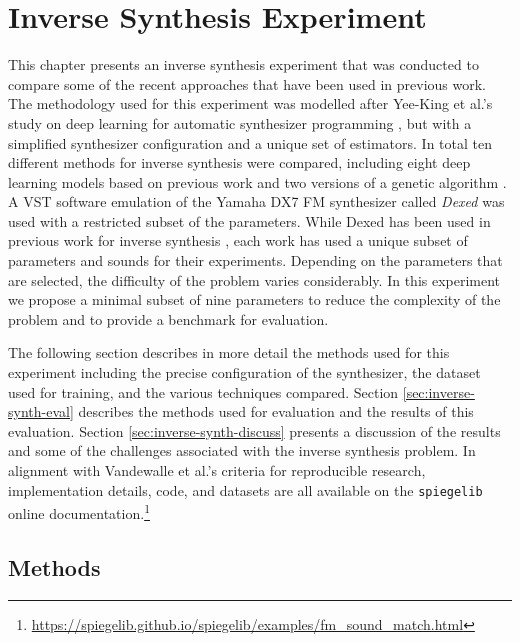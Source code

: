 \chapter{Inverse Synthesis Experiment}
\label{chapter:inverse_synth_experiment}

This chapter presents an inverse synthesis experiment that was conducted to compare some of the recent approaches that have been used in previous work. The methodology used for this experiment was modelled after Yee-King et al.'s study on deep learning for automatic synthesizer programming \cite{yee2018automatic}, but with a simplified synthesizer configuration and a unique set of estimators. In total ten different methods for inverse synthesis were compared, including eight deep learning models based on previous work \cite{barkan2019inversynth, yee2018automatic} and two versions of a genetic algorithm \cite{horner1993machine, tatar2016automatic}. A VST software emulation of the Yamaha DX7 FM synthesizer called \textit{Dexed} was used with a restricted subset of the parameters. While Dexed has been used in previous work for inverse synthesis \cite{yee2018automatic, luke2019stochastic, le2021improving, masudo2021quality}, each work has used a unique subset of parameters and sounds for their experiments. Depending on the parameters that are selected, the difficulty of the problem varies considerably. In this experiment we propose a minimal subset of nine parameters to reduce the complexity of the problem and to provide a benchmark for evaluation.

The following section describes in more detail the methods used for this experiment including the precise configuration of the synthesizer, the dataset used for training, and the various techniques compared. Section \ref{sec:inverse-synth-eval} describes the methods used for evaluation and the results of this evaluation. Section \ref{sec:inverse-synth-discuss} presents a discussion of the results and some of the challenges associated with the inverse synthesis problem. In alignment with Vandewalle et al.'s criteria for reproducible research, implementation details, code, and datasets are all available on the \texttt{spiegelib} online documentation.\footnote{\url{https://spiegelib.github.io/spiegelib/examples/fm_sound_match.html}}

\section{Methods}

